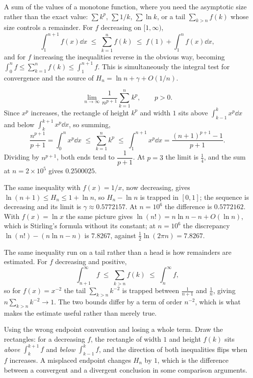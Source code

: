 \cue A sum of the values of a monotone function, where you need the asymptotic size rather than the exact value: $\sum k^{p}$, $\sum 1/k$, $\sum\ln k$, or a tail $\sum_{k>n}f(k)$ whose size controls a remainder.
\method For $f$ decreasing on $[1,\infty)$,
\[\int_{1}^{n+1}f(x)\dd x\;\leq\;\sum_{k=1}^{n}f(k)\;\leq\;f(1)+\int_{1}^{n}f(x)\dd x,\]
and for $f$ increasing the inequalities reverse in the obvious way, becoming $\int_{0}^{n}f\leq\sum_{k=1}^{n}f(k)\leq\int_{1}^{n+1}f$. This is simultaneously the integral test for convergence and the source of $H_{n}=\ln n+\gamma+O(1/n)$.

\begin{worked}
\[\lim_{n\to\infty}\frac{1}{n^{p+1}}\sum_{k=1}^{n}k^{p},\qquad p>0.\]
Since $x^{p}$ increases, the rectangle of height $k^{p}$ and width $1$ sits above $\int_{k-1}^{k}x^{p}\dd x$ and below $\int_{k}^{k+1}x^{p}\dd x$, so summing,
\[\frac{n^{p+1}}{p+1}=\int_{0}^{n}x^{p}\dd x\;\leq\;\sum_{k=1}^{n}k^{p}\;\leq\;\int_{1}^{n+1}x^{p}\dd x=\frac{(n+1)^{p+1}-1}{p+1}.\]
Dividing by $n^{p+1}$, both ends tend to $\dfrac{1}{p+1}$. At $p=3$ the limit is $\tfrac14$, and the sum at $n=2\times10^{5}$ gives $0.2500025$.

The same inequality with $f(x)=1/x$, now decreasing, gives $\ln(n+1)\leq H_{n}\leq1+\ln n$, so $H_{n}-\ln n$ is trapped in $[0,1]$; the sequence is decreasing and its limit is $\gamma\approx0.5772157$. At $n=10^{6}$ the difference is $0.5772162$. With $f(x)=\ln x$ the same picture gives $\ln(n!)=n\ln n-n+O(\ln n)$, which is Stirling's formula without its constant; at $n=10^{6}$ the discrepancy $\ln(n!)-(n\ln n-n)$ is $7.8267$, against $\tfrac12\ln(2\pi n)=7.8267$.

The same inequality run on a tail rather than a head is how remainders are estimated. For $f$ decreasing and positive,
\[\int_{n+1}^{\infty}f\;\leq\;\sum_{k>n}f(k)\;\leq\;\int_{n}^{\infty}f,\]
so for $f(x)=x^{-2}$ the tail $\sum_{k>n}k^{-2}$ is trapped between $\tfrac{1}{n+1}$ and $\tfrac1n$, giving $n\sum_{k>n}k^{-2}\to1$. The two bounds differ by a term of order $n^{-2}$, which is what makes the estimate useful rather than merely true.
\end{worked}

\begin{trap}
Using the wrong endpoint convention and losing a whole term. Draw the rectangles: for a decreasing $f$, the rectangle of width $1$ and height $f(k)$ sits \emph{above} $\int_{k}^{k+1}f$ and \emph{below} $\int_{k-1}^{k}f$, and the direction of both inequalities flips when $f$ increases. A misplaced endpoint changes $H_{n}$ by $1$, which is the difference between a convergent and a divergent conclusion in some comparison arguments.
\end{trap}

